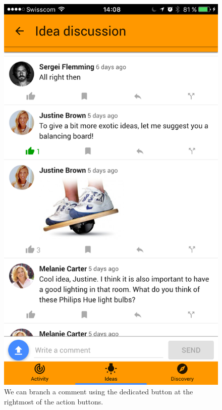 \documentclass[a4paper,12pt,twoside]{article}
\begin{document}
\begin{figure}[!htb]
    \begin{minipage}[t]{.32\textwidth}
        \centering
        \includegraphics[width=\textwidth]{images/flow_branch_1.png}
        \caption{We can branch a comment using the dedicated button at the rightmost of the action buttons.}
    \end{minipage}
    \hfill
    \begin{minipage}[t]{.32\textwidth}
        \centering

\end{minipage}
\end{figure}
\end{document}
